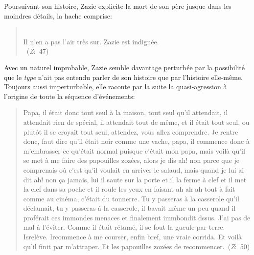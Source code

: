 Poursuivant son histoire, Zazie explicite la mort de son père jusque dans les moindres détails, la hache comprise:
\begin{quote}
  \begin{singlespace}
    \small
    \\
    Il n'en a pas l'air très sur. Zazie est indignée.\\
    ~(\textit{Z}:~47)
    \normalsize
  \end{singlespace}
\end{quote}
Avec un naturel improbable, Zazie semble davantage perturbée par la possibilité que le \textit{type} n'ait pas entendu parler de son histoire que par l'histoire elle-même.
Toujours aussi imperturbable, elle raconte par la suite la quasi-agression à l'origine de toute la séquence d'événements:
\begin{quote}
  \begin{singlespace}
    \small
    Papa, il était donc tout seul à la maison, tout seul qu'il attendait, il attendait rien de spécial, il attendait tout de même, et il était tout seul, ou plutôt il se croyait tout seul, attendez, vous allez comprendre. Je rentre donc, faut dire qu'il était noir comme une vache, papa, il commence donc à m'embrasser ce qu'était normal puisque c'était mon papa, mais voilà qu'il se met à me faire des papouilles zozées, alors je dis ah! non parce que je comprenais où c'est qu'il voulait en arriver le salaud, mais quand je lui ai dit ah! non ça jamais, lui il saute sur la porte et il la ferme à clef et il met la clef dans sa poche et il roule les yeux en faisant ah ah ah tout à fait comme au cinéma, c'était du tonnerre. Tu y passeras à la casserole qu'il déclamait, tu y passeras à la casserole, il bavait même un peu quand il proférait ces immondes menaces et finalement immbondit dssus. J'ai pas de mal à l'éviter. Comme il était rétamé, il se fout la gueule par terre. Isrelève. Ircommence à me courser, enfin bref, une vraie corrida. Et voilà qu'il finit par m'attraper. Et les papouilles zozées de recommencer.~(\textit{Z}:~50)
    \normalsize
  \end{singlespace}
\end{quote}
